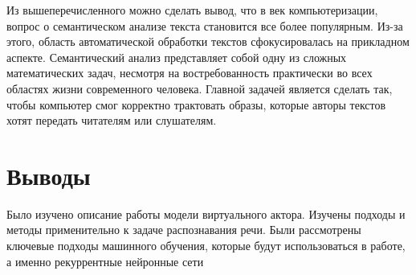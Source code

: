 Из вышеперечисленного можно сделать вывод, что в век компьютеризации, 
вопрос о семантическом анализе текста становится все более
популярным. Из-за этого, область автоматической обработки текстов
сфокусировалась на прикладном аспекте. Семантический анализ представляет 
собой одну из сложных математических задач, несмотря на
востребованность практически во всех областях жизни современного
человека. Главной задачей является сделать так, чтобы компьютер смог
корректно трактовать образы, которые авторы текстов хотят передать
читателям или слушателям. 

\section{Выводы}


Было изучено описание работы модели виртуального актора. Изучены подходы и методы применительно к задаче распознавания речи.
Были рассмотрены ключевые подходы машинного обучения, которые будут использоваться в работе, а именно рекуррентные нейронные сети
